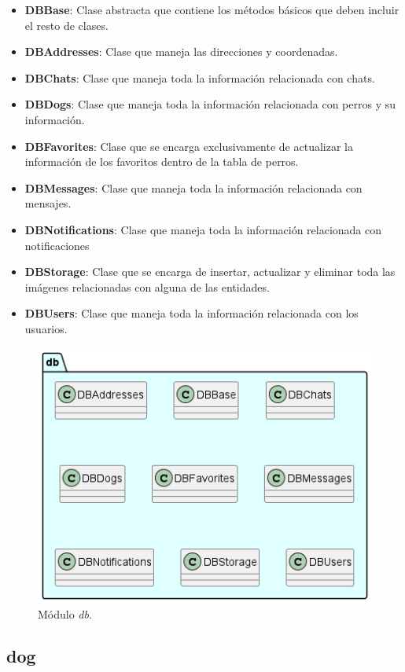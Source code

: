 \documentclass[a4paper, 12pt]{article}
\begin{document}
\begin{itemize}[noitemsep]
	\item \textbf{DBBase}: Clase abstracta que contiene los métodos básicos que deben incluir el resto de clases.
	\item \textbf{DBAddresses}: Clase que maneja las direcciones y coordenadas.
	\item \textbf{DBChats}: Clase que maneja toda la información relacionada con chats.
	\item \textbf{DBDogs}: Clase que maneja toda la información relacionada con perros y su información.
	\item \textbf{DBFavorites}: Clase que se encarga exclusivamente de actualizar la información de los favoritos dentro de la tabla de perros.
	\item \textbf{DBMessages}: Clase que maneja toda la información relacionada con mensajes.
	\item \textbf{DBNotifications}: Clase que maneja toda la información relacionada con notificaciones
	\item \textbf{DBStorage}: Clase que se encarga de insertar, actualizar y eliminar toda las imágenes relacionadas con alguna de las entidades.
	\item \textbf{DBUsers}: Clase que maneja toda la información relacionada con los usuarios.
\end{itemize}

\begin{figure}[H]
	\begin{center}
		{\includegraphics[width=0.7\linewidth]{diagram/DB.png}\par}
		\caption{Módulo  \textit{db}.}
	\end{center}
\end{figure}


\subsection*{dog}
\end{document}
